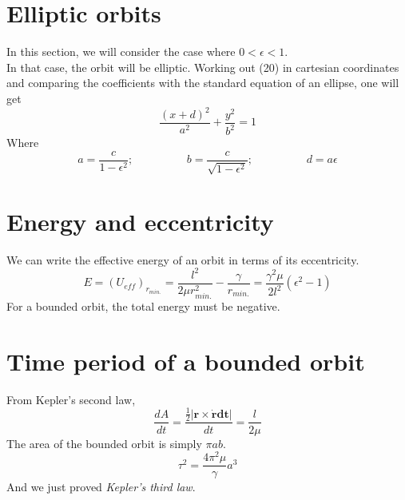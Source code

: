 \documentclass[12pt, letterpaper]{article}
\begin{document}
\section{Elliptic orbits}
In this section, we will consider the case where $0<\epsilon<1$. \\
In that case, the orbit will be elliptic. Working out (20) in cartesian coordinates and comparing the coefficients with the standard equation of an ellipse, one will get 
\begin{equation}
    \frac{(x+d)^2}{a^2}+\frac{y^2}{b^2}=1
\end{equation}
Where 
\begin{equation}
    a = \frac{c}{1-\epsilon^2};\hspace{2cm}b=\frac{c}{\sqrt{1-\epsilon^2}};\hspace{2cm}d=a\epsilon
\end{equation}

\section{Energy and eccentricity}
We can write the effective energy of an orbit in terms of its eccentricity.
\begin{equation}
    E = (U_{eff})_{r_{min.}}=\frac{l^2}{2\mu r_{min.}^2}-\frac{\gamma}{r_{min.}} = \frac{\gamma^2 \mu}{2l^2}(\epsilon^2-1)
\end{equation}
For a bounded orbit, the total energy must be negative. 
\section{Time period of a bounded orbit}
From Kepler's second law,
\[\frac{dA}{dt}=\frac{\frac{1}{2}|\mathbf{r}\times \mathbf{\dot{\mathbf{r}}dt}|}{dt} = \frac{l}{2\mu}\]
The area of the bounded orbit is simply $\pi ab$. 
\begin{equation}
    \tau^2 = \frac{4\pi^2\mu}{\gamma}a^3
\end{equation}
And we just proved \textit{Kepler's third law}.
\end{document}
